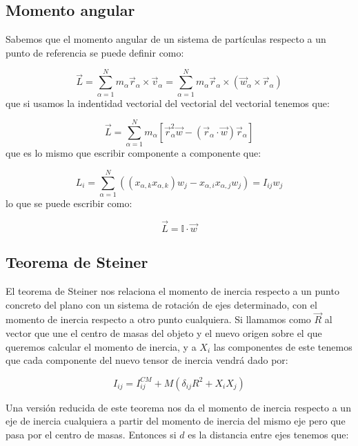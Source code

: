 \documentclass[12pt,a4paper]{book}
\begin{document}
\subsection{Momento angular}

Sabemos que el momento angular de un sistema de partículas respecto a un punto de referencia se puede definir como:

\begin{equation}
\vec{L} = \sum_{\alpha=1}^N  m_\alpha \vec{r}_\alpha \times \vec{v}_\alpha =\sum_{\alpha=1}^N  m_\alpha \vec{r}_\alpha \times  ( \vec{w}_\alpha \times \vec{r}_\alpha  )
\end{equation}
que si usamos la indentidad vectorial del vectorial del vectorial tenemos que:

\begin{equation}
\vec{L} = \sum_{\alpha = 1}^N m_\alpha [ \vec{r}_\alpha^2 \vec{w} - (\vec{r}_\alpha \cdot \vec{w}) \vec{r}_\alpha ]
\end{equation}
que es lo mismo que escribir componente a componente que:

\begin{equation}
L_{i} = \sum_{\alpha=1}^N ((x_{\alpha,k} x_{\alpha,k} ) w_j - x_{\alpha,i} x_{\alpha,j} w_j) = I_{ij} w_j
\end{equation}
lo que se puede escribir como:

\begin{equation}
\vec{L} = \mathbb{I} \cdot \vec{w}
\end{equation}

\subsection{Teorema de Steiner}

El teorema de Steiner nos relaciona el momento de inercia respecto a un punto concreto del plano con un sistema de rotación de ejes determinado, con el momento de inercia respecto a otro punto cualquiera. Si llamamos como $\vec{R}$ al vector que une el centro de masas del objeto y el nuevo origen sobre el que queremos calcular el momento de inercia, y a $X_i$ las componentes de este tenemos que cada componente del nuevo tensor de inercia vendrá dado por:

\begin{equation}
I_{ij} = I_{ij}^{CM} + M (\delta_{ij} R^2 + X_i X_j)
\end{equation}

Una versión reducida de este teorema nos da el momento de inercia respecto a un eje de inercia cualquiera a partir del momento de inercia del mismo eje pero que pasa por el centro de masas. Entonces si $d$ es la distancia entre ejes tenemos que:
\end{document}
